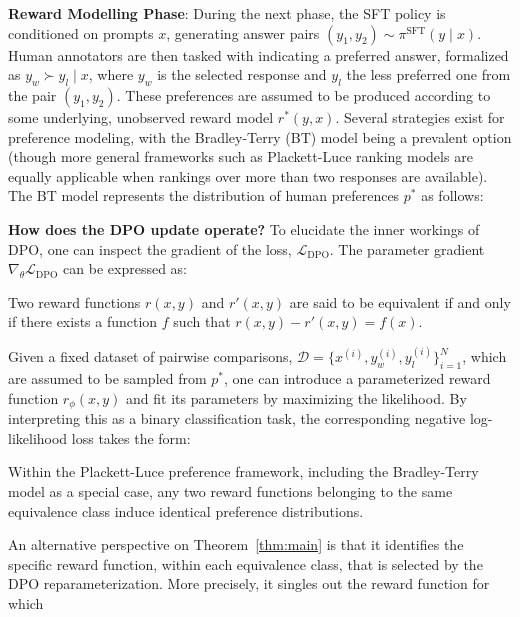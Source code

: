 \textbf{Reward Modelling Phase}: During the next phase, the SFT policy is conditioned on prompts $x$, generating answer pairs $(y_1, y_2)\sim \pi^\text{SFT}(y \mid x)$. Human annotators are then tasked with indicating a preferred answer, formalized as $y_w\succ y_l \mid x$, where $y_w$ is the selected response and $y_l$ the less preferred one from the pair $(y_1, y_2)$. These preferences are assumed to be produced according to some underlying, unobserved reward model $r^*(y, x)$. Several strategies exist for preference modeling, with the Bradley-Terry (BT) model \cite{bradley1952rankanalysis} being a prevalent option (though more general frameworks such as Plackett-Luce ranking models \citep{plackett1975analysis, luce2012individual} are equally applicable when rankings over more than two responses are available). The BT model represents the distribution of human preferences $p^*$ as follows:

\textbf{How does the DPO update operate?} To elucidate the inner workings of DPO, one can inspect the gradient of the loss, $\mathcal{L}_\text{DPO}$. The parameter gradient $\nabla_\theta \mathcal{L}_\text{DPO}$ can be expressed as:

\begin{definition}
Two reward functions $r(x, y)$ and $r'(x, y)$ are said to be equivalent if and only if there exists a function $f$ such that ${r(x, y)-r'(x, y) = f(x)}$.
\end{definition}

Given a fixed dataset of pairwise comparisons, $\mathcal{D}=\bigl\{x^{(i)}, y_w^{(i)}, y_l^{(i)}\bigr\}_{i=1}^N$, which are assumed to be sampled from $p^*$, one can introduce a parameterized reward function $r_{\phi}(x, y)$ and fit its parameters by maximizing the likelihood. By interpreting this as a binary classification task, the corresponding negative log-likelihood loss takes the form:

\begin{lemma}\label{lemma:same_prefrence} 
Within the Plackett-Luce preference framework, including the Bradley-Terry model as a special case, any two reward functions belonging to the same equivalence class induce identical preference distributions.
\end{lemma}

An alternative perspective on Theorem~\ref{thm:main} is that it identifies the specific reward function, within each equivalence class, that is selected by the DPO reparameterization. More precisely, it singles out the reward function for which

